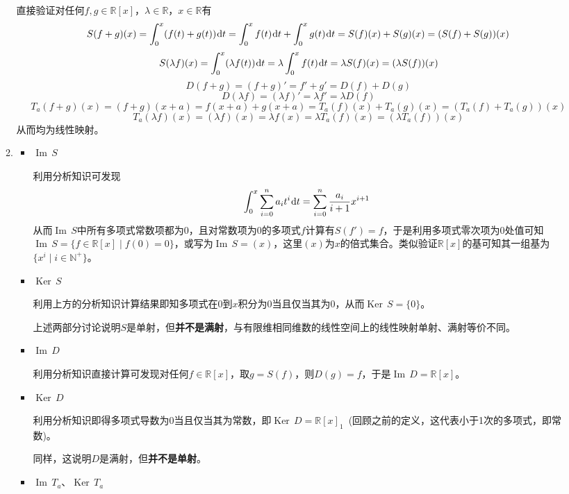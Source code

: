 \documentclass[a4paper,UTF8,fontset=windows,AutoFakeBold]{ctexart}
\DeclareMathOperator{\im}{Im\,}
\DeclareMathOperator{\Ker}{Ker\,}
\newcommand*{\dr}{\hspace{0.07em}\mathrm{d}}
\newcommand*{\note}{\noindent *}
\begin{document}
\begin{enumerate}
\begin{enumerate}
        直接验证对任何$f,g\in\mathbb{R}[x]$，$\lambda\in\mathbb{R}$，$x\in\mathbb{R}$有
        $$S(f+g)(x)=\int_0^x(f(t)+g(t))\dr t=\int_0^xf(t)\dr t+\int_0^xg(t)\dr t=S(f)(x)+S(g)(x)=(S(f)+S(g))(x)$$
        $$S(\lambda f)(x)=\int_0^x(\lambda f(t))\dr t=\lambda\int_0^xf(t)\dr t=\lambda S(f)(x)=(\lambda S(f))(x)$$
        $$D(f+g)=(f+g)'=f'+g'=D(f)+D(g)$$
        $$D(\lambda f)=(\lambda f)'=\lambda f'=\lambda D(f)$$
        $$T_a(f+g)(x)=(f+g)(x+a)=f(x+a)+g(x+a)=T_a(f)(x)+T_a(g)(x)=(T_a(f)+T_a(g))(x)$$
        $$T_a(\lambda f)(x)=(\lambda f)(x)=\lambda f(x)=\lambda T_a(f)(x)=(\lambda T_a(f))(x)$$
        从而均为线性映射。

        \item
        \begin{itemize}
            \item $\im S$
            
            利用分析知识可发现
            $$\int_0^x\sum_{i=0}^na_it^i\dr t=\sum_{i=0}^{n}\frac{a_i}{i+1}x^{i+1}$$
            从而$\im S$中所有多项式常数项都为0，且对常数项为0的多项式$f$计算有$S(f')=f$，于是利用多项式零次项为0处值可知$\im S=\{f\in\mathbb{R}[x]\mid f(0)=0\}$，或写为$\im S=(x)$，这里$(x)$为$x$的倍式集合。类似验证$\mathbb{R}[x]$的基可知其一组基为$\{x^i\mid i\in\mathbb{N}^+\}$。

            \item $\Ker S$
            
            利用上方的分析知识计算结果即知多项式在0到$x$积分为0当且仅当其为0，从而$\Ker S=\{0\}$。

            \note 上述两部分讨论说明$S$是单射，但\textbf{并不是满射}，与有限维相同维数的线性空间上的线性映射单射、满射等价不同。

            \item $\im D$
            
            利用分析知识直接计算可发现对任何$f\in\mathbb{R}[x]$，取$g=S(f)$，则$D(g)=f$，于是$\im D=\mathbb{R}[x]$。
            
            \item $\Ker D$
            
            利用分析知识即得多项式导数为0当且仅当其为常数，即$\Ker D=\mathbb{R}[x]_1$\ (回顾之前的定义，这代表小于1次的多项式，即常数)。
            
            \note 同样，这说明$D$是满射，但\textbf{并不是单射}。
            
            \item $\im T_a$、$\Ker T_a$
            

\end{itemize}
\end{enumerate}
\end{enumerate}
\end{document}
